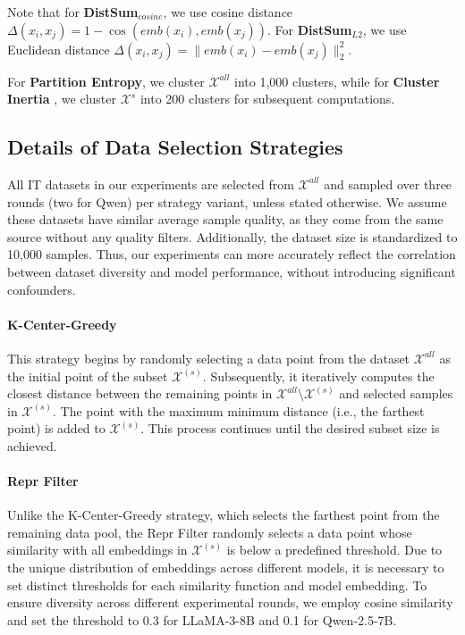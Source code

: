 Note that for \textbf{DistSum$_{cosine}$}, we use cosine distance $\Delta(x_i, x_j) = 1 - \cos(emb(x_i), emb(x_j))$. For \textbf{DistSum$_{L2}$}, we use Euclidean distance $\Delta(x_i, x_j) = \|emb(x_i) - emb(x_j)\|^{2}_2$.

For \textbf{Partition Entropy}, we cluster $\mathcal{X}^{all}$ into 1,000 clusters, while for \textbf{Cluster Inertia} \cite{du2019boosting-Inertia}, we cluster $\mathcal{X}^{s}$ into 200 clusters for subsequent computations.


\subsection{Details of Data Selection Strategies}
\label{app:ds}

All IT datasets in our experiments are selected from $\mathcal{X}^{all}$ and sampled over three rounds (two for Qwen) per strategy variant, unless stated otherwise. We assume these datasets have similar average sample quality, as they come from the same source without any quality filters. Additionally, the dataset size is standardized to 10,000 samples. Thus, our experiments can more accurately reflect the correlation between dataset diversity and model performance, without introducing significant confounders.

\paragraph{K-Center-Greedy} \cite{sener2017active-Kcentergreedy, chen2023maybe-Kcentergreedy, du2023mods-Kcentergreedy, wu2023self-Kcentergreedy} This strategy begins by randomly selecting a data point from the dataset $\mathcal{X}^{all}$ as the initial point of the subset $\mathcal{X}^{(s)}$. Subsequently, it iteratively computes the closest distance between the remaining points in $\mathcal{X}^{all} \setminus \mathcal{X}^{(s)}$ and selected samples in $\mathcal{X}^{(s)}$. The point with the maximum minimum distance (i.e., the farthest point) is added to $\mathcal{X}^{(s)}$. This process continues until the desired subset size is achieved.

\paragraph{Repr Filter} \cite{liu2023makes} Unlike the K-Center-Greedy strategy, which selects the farthest point from the remaining data pool, the Repr Filter randomly selects a data point whose similarity with all embeddings in $\mathcal{X}^{(s)}$ is below a predefined threshold. Due to the unique distribution of embeddings across different models, it is necessary to set distinct thresholds for each similarity function and model embedding. To ensure diversity across different experimental rounds, we employ cosine similarity and set the threshold to 0.3 for LLaMA-3-8B and 0.1 for Qwen-2.5-7B.


